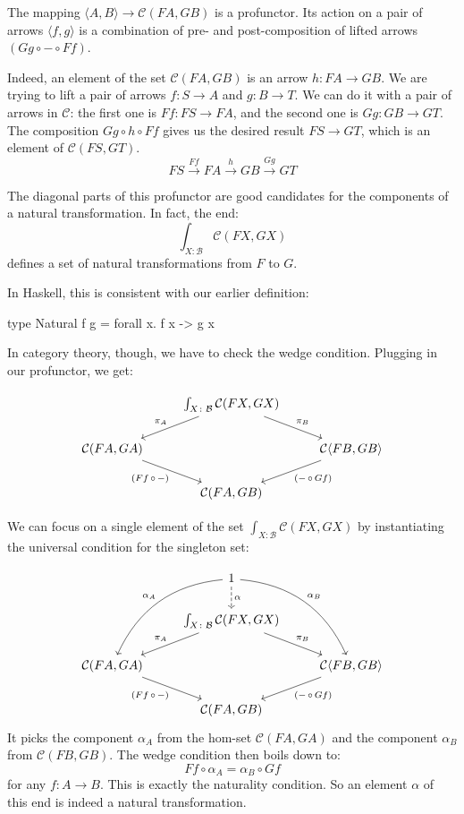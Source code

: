 \documentclass[DaoFP]{subfiles}
\begin{document}
The mapping  $\langle A, B \rangle \to \mathcal{C} (F A, G B)$ is a profunctor. Its action on a pair of arrows $\langle f, g \rangle$ is a combination of pre- and post-composition of lifted arrows $(G g \circ - \circ F f)$. 

Indeed, an element of the set $ \mathcal{C} (F A, G B)$ is an arrow $h \colon F A \to G B$. We are trying to lift a pair of arrows $f \colon S \to A$ and $g \colon B \to T$. We can do it with a pair of arrows in $\mathcal{C}$: the first one is $F f \colon F S \to F A$, and the second one is $G g \colon G B \to G T$. The composition $G g \circ h \circ F f$ gives us the desired result $ F S \to G T$, which is an element of $\mathcal{C} (F S, G T)$.
\[ F S \xrightarrow{F f} F A \xrightarrow{h} G B \xrightarrow{G g} GT \]

The diagonal parts of this profunctor are good candidates for the components of a natural transformation. In fact, the end:
\[  \int_{X \colon  \mathcal{B}} \mathcal{C}(FX, GX) \]
defines a set of natural transformations from $F$ to $G$.

In Haskell, this is consistent with our earlier definition:
\begin{haskell}
type Natural f g = forall x. f x -> g x
\end{haskell}

In category theory, though, we have to check the wedge condition. Plugging in our profunctor, we get:

\[
 \begin{tikzcd}
 & \int_{X \colon  \mathcal{B}} \mathcal{C}(FX, GX)
 \arrow[ld, "\pi_A"']
 \arrow[rd, "\pi_B"]
 \\
  \mathcal{C} ( FA, GA )
 \arrow[dr, "{(Ff \, \circ \, -)}"']
 && \mathcal{C} \langle FB, GB \rangle
 \arrow[dl, "{(- \, \circ\, Gf)}"]
 \\
 &  \mathcal{C} ( FA, GB )
 \end{tikzcd}
\]

We can focus on a single element of the set $\int_{X \colon  \mathcal{B}} \mathcal{C}(FX, GX)$ by instantiating the universal condition for the singleton set:

\[
 \begin{tikzcd}
 & 1
 \arrow[d, dashed, "\alpha"]
\arrow[ddl, bend right, "\alpha_A"']
 \arrow[ddr, bend left, "\alpha_B"]
 \\
 & \int_{X \colon  \mathcal{B}} \mathcal{C}(FX, GX)
 \arrow[ld, "\pi_A"']
 \arrow[rd, "\pi_B"]
 \\
  \mathcal{C} ( FA, GA )
 \arrow[dr, "{(Ff \, \circ \, -)}"']
 && \mathcal{C} \langle FB, GB \rangle
 \arrow[dl, "{(- \, \circ\, Gf)}"]
 \\
 &  \mathcal{C} ( FA, GB )
 \end{tikzcd}
\]
It picks the component $\alpha_A$ from the hom-set $\mathcal{C} ( FA, GA )$ and the component $\alpha_B$ from $\mathcal{C} ( FB, GB )$. The wedge condition then boils down to:
\[ F f \circ \alpha_A = \alpha_B \circ G f \]
for any $f \colon A \to B$. This is exactly the naturality condition. So an element $\alpha$ of this end is indeed a natural transformation.
\end{document}
